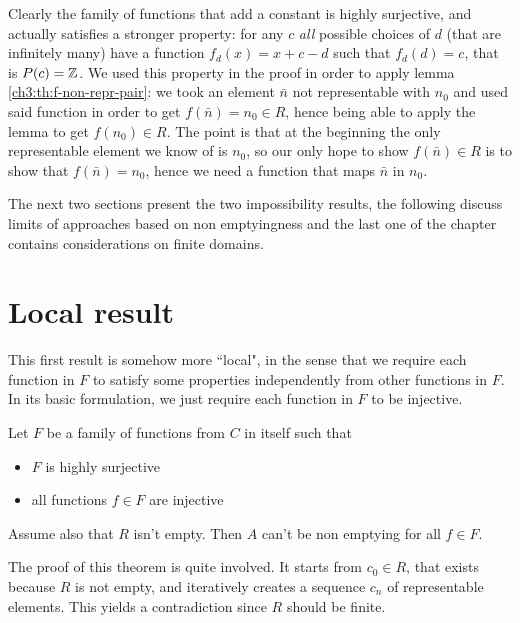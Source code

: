 Clearly the family of functions that add a constant is highly surjective, and actually satisfies a stronger property: for any $c$ \textit{all} possible choices of $d$ (that are infinitely many) have a function $f_d(x) = x + c - d$ such that $f_d(d) = c$, that is $P(c) = \mathbb{Z}$. We used this property in the proof in order to apply lemma \ref{ch3:th:f-non-repr-pair}: we took an element $\bar{n}$ not representable with $n_0$ and used said function in order to get $f(\bar{n}) = n_0 \in R$, hence being able to apply the lemma to get $f(n_0) \in R$. The point is that at the beginning the only representable element we know of is $n_0$, so our only hope to show $f(\bar{n}) \in R$ is to show that $f(\bar{n}) = n_0$, hence we need a function that maps $\bar{n}$ in $n_0$.

The next two sections present the two impossibility results, the following discuss limits of approaches based on non emptyingness and the last one of the chapter contains considerations on finite domains.

\section{Local result}
This first result is somehow more ``local", in the sense that we require each function in $F$ to satisfy some properties independently from other functions in $F$. In its basic formulation, we just require each function in $F$ to be injective.

\begin{theorem}\label{ch4:th:non-empt-res-local-basic}
	Let $F$ be a family of functions from $C$ in itself such that
	\begin{itemize}
		\item $F$ is highly surjective
		\item all functions $f \in F$ are injective
	\end{itemize}
	Assume also that $R$ isn't empty. Then $A$ can't be non emptying for all $f \in F$.
\end{theorem}
The proof of this theorem is quite involved. It starts from $c_0 \in R$, that exists because $R$ is not empty, and iteratively creates a sequence $c_n$ of representable elements. This yields a contradiction since $R$ should be finite.

